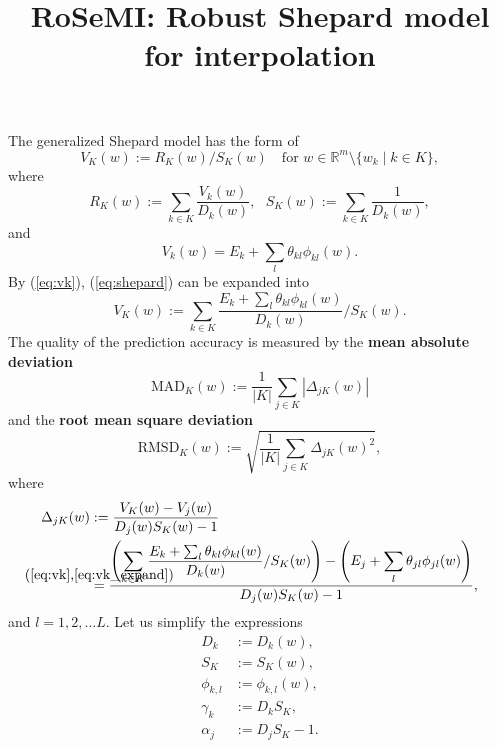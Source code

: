 \documentclass[12pt]{article}
\title{RoSeMI: Robust Shepard model for interpolation}
\newcommand{\defeq}[2]{\stackrel{\mathclap{\normalfont\mbox{#1}}}{#2}}
\def\D{\displaystyle}
\begin{document}
\maketitle
The generalized Shepard model has the form of 
\begin{equation}
    \label{eq:shepard}
    V_K(w):=R_K(w)/S_K(w) ~~~ \text{ for } w \in \mathbb{R}^m \setminus \{w_k\mid k\in K \},
\end{equation}
where
\begin{equation}
    R_K(w):=\sum_{k\in K} \frac{V_k(w)}{D_k(w)},~~~
    S_K(w):=\sum_{k\in K} \frac{1}{D_k(w)},
\end{equation}
and
\begin{equation}
    \label{eq:vk}
    V_k(w) = E_k + \sum_l \theta_{kl} \phi_{kl}(w).
\end{equation}
By (\ref{eq:vk}), (\ref{eq:shepard}) can be expanded into
\begin{equation}
    \label{eq:vk_expand}
    V_K(w) := \sum_{k\in K} \frac{E_k + \sum_l \theta_{kl} \phi_{kl}(w)}{D_k(w)} / S_K(w). 
\end{equation}
The quality of the prediction accuracy is measured by the \textbf{mean absolute deviation}
\begin{equation}
    \text{MAD}_K(w) := \frac{1}{|K|}\sum_{j\in K}|\Delta_{jK}(w)|
\end{equation}
and the \textbf{root mean square deviation}
\begin{equation}
    \text{RMSD}_K(w) := \sqrt{\frac{1}{|K|}\sum_{j\in K}\Delta_{jK}(w)^2},
\end{equation}
where
\begin{equation}
    \label{eq:delta}
    \begin{split}
        \Delta_{jK}(w)&:=\D\frac{V_K(w)-V_j(w)}{D_j(w)S_K(w)-1} \\
        &\defeq{(\refeq{eq:vk},\refeq{eq:vk_expand})}{=} \frac{\D \left(\sum_{k\in K} \frac{E_k + \sum_l \theta_{kl} \phi_{kl}(w)}{D_k(w)} / S_K(w)\right) - \left(E_j + \sum_l \theta_{jl} \phi_{jl}(w)\right)}{D_j(w)S_K(w)-1}, \\
    \end{split}
\end{equation}
and $l=1,2,...L$.
Let us simplify the expressions
\begin{equation*}
    \begin{split}
        D_k &:= D_k(w), \\
        S_K &:= S_K(w), \\
        \phi_{k,l} &:= \phi_{k,l}(w),\\
        \gamma_k &:= D_kS_K, \\
        \alpha_j &:= D_jS_K-1.
    \end{split}
\end{equation*}
\end{document}
